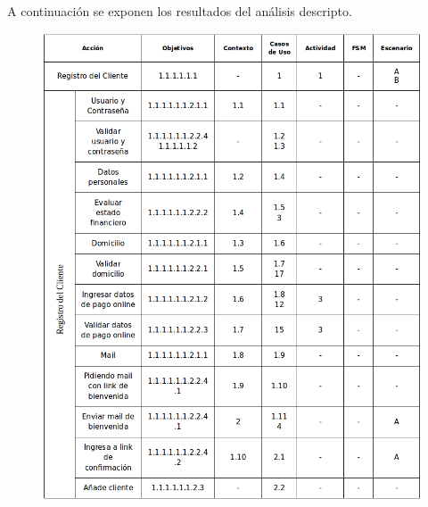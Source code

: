 A continuación se exponen los resultados del análisis descripto.

\begin{figure}[H]
	\begin{center}
	\includegraphics[width=\textwidth]{imagenes/trazabilidad-registro-cliente.png}
	\end{center}
	\label{trazabilidad-registro-cliente}
\end{figure}

